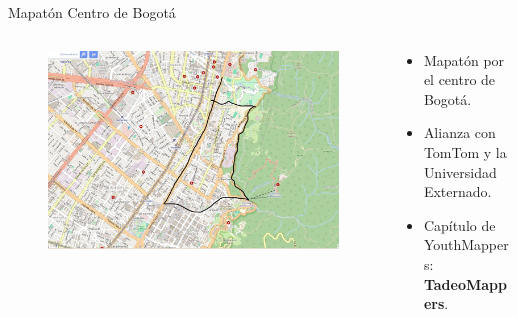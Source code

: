 \documentclass{beamer}
\begin{document}
\begin{frame}{Mapatón Centro de Bogotá}

  \begin{columns}
    \begin{column}{.5\textwidth}
      \begin{figure}
        \centering
        \includegraphics[width=\textwidth]{img/Mapaton.jpg}
      \end{figure}
    \end{column}

    \begin{column}{.5\textwidth}

      \begin{itemize}
      \item Mapatón por el centro de Bogotá.
      \item Alianza con TomTom y la Universidad Externado.
      \item Capítulo de YouthMappers: \textbf{TadeoMappers}.
      \end{itemize}
    \end{column}
  \end{columns}


\end{frame}
\end{document}
